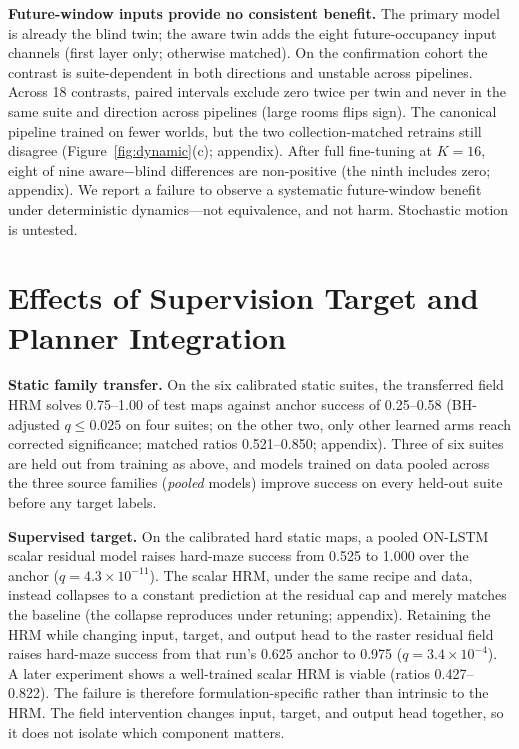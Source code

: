\documentclass[letterpaper]{article} %
\begin{document}
\textbf{Future-window inputs provide no consistent benefit.} The primary model is already the blind twin; the aware twin adds the eight future-occupancy input channels (first layer only; otherwise matched). On the confirmation cohort the contrast is suite-dependent in both directions and unstable across pipelines. Across 18 contrasts, paired intervals exclude zero twice per twin and never in the same suite and direction across pipelines (large rooms flips sign). The canonical pipeline trained on fewer worlds, but the two collection-matched retrains still disagree (Figure~\ref{fig:dynamic}(c); appendix). After full fine-tuning at $K{=}16$, eight of nine aware$-$blind differences are non-positive (the ninth includes zero; appendix). We report a failure to observe a systematic future-window benefit under deterministic dynamics---not equivalence, and not harm. Stochastic motion is untested.

\section{Effects of Supervision Target and Planner Integration}

\textbf{Static family transfer.} On the six calibrated static suites, the transferred field HRM solves 0.75--1.00 of test maps against anchor success of 0.25--0.58 (BH-adjusted $q \leq 0.025$ on four suites; on the other two, only other learned arms reach corrected significance; matched ratios 0.521--0.850; appendix). Three of six suites are held out from training as above, and models trained on data pooled across the three source families (\emph{pooled} models) improve success on every held-out suite before any target labels.

\textbf{Supervised target.} On the calibrated hard static maps, a pooled ON-LSTM scalar residual model raises hard-maze success from 0.525 to 1.000 over the anchor ($q=4.3\times10^{-11}$). The scalar HRM, under the same recipe and data, instead collapses to a constant prediction at the residual cap and merely matches the baseline (the collapse reproduces under retuning; appendix). Retaining the HRM while changing input, target, and output head to the raster residual field raises hard-maze success from that run's 0.625 anchor to 0.975 ($q=3.4\times10^{-4}$). A later experiment shows a well-trained scalar HRM is viable (ratios 0.427--0.822). The failure is therefore formulation-specific rather than intrinsic to the HRM. The field intervention changes input, target, and output head together, so it does not isolate which component matters.
\end{document}
